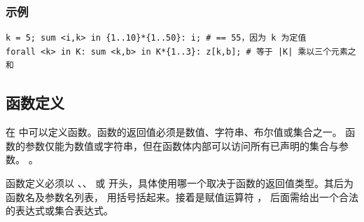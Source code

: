 \subsubsection{示例}
{\small
\begin{verbatim}
k = 5; sum <i,k> in {1..10}*{1..50}: i; # == 55，因为 k 为定值
forall <k> in K: sum <k,b> in K*{1..3}: z[k,b]; # 等于 |K| 乘以三个元素之和
\end{verbatim}
}

\subsection{函数定义}

在 \zimpl 中可以定义函数。函数的返回值必须是数值、字符串、布尔值或集合之一。  
函数的参数仅能为数值或字符串，但在函数体内部可以访问所有已声明的集合与参数。
。

函数定义必须以 、、 或 
开头，具体使用哪一个取决于函数的返回值类型。其后为函数名及参数名列表，
用括号括起来。接着是赋值运算符 \code{:=}，
后面需给出一个合法的表达式或集合表达式。

